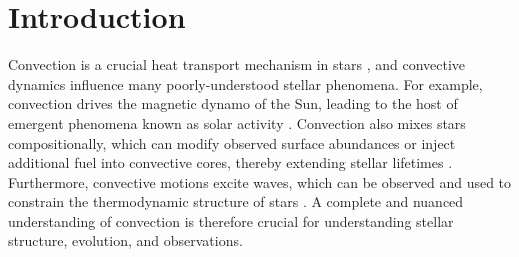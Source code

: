 \documentclass{aastex631}
\begin{document}
\section{Introduction}
\label{sec:introduction}
Convection is a crucial heat transport mechanism in stars \citep{woosley_etal_2002, hansen_etal_2004, christensen-dalsgaard_2021}, and convective dynamics influence many poorly-understood stellar phenomena.
For example, convection drives the magnetic dynamo of the Sun, leading to the host of emergent phenomena known as solar activity \citep{brun_browning_2017}.
Convection also mixes stars compositionally, which can modify observed surface abundances or inject additional fuel into convective cores, thereby extending stellar lifetimes \citep{salaris_cassisi_2017}.
Furthermore, convective motions excite waves, which can be observed and used to constrain the thermodynamic structure of stars \citep{aerts2010, basu2016}.
A complete and nuanced understanding of convection is therefore crucial for understanding stellar structure, evolution, and observations.
\end{document}
